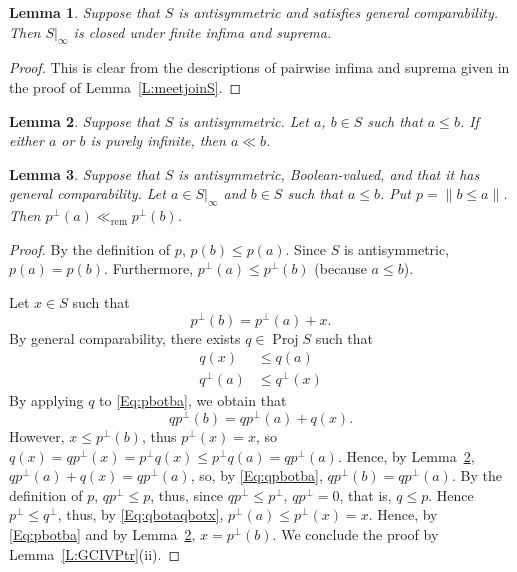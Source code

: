 \documentclass[psamsfonts,reqno]{memo-l}
\theoremstyle{plain}
\newtheorem{lemma}{Lemma}[section]
\theoremstyle{definition}
\theoremstyle{remark}
\numberwithin{equation}{section}
\newcommand{\rem}{\ll_{\mathrm{rem}}}
\newcommand{\DI}[1]{#1|_{\infty}}
\newcommand{\bv}[1]{\left\|#1\right\|}
\DeclareMathOperator{\BB}{Proj}
\begin{document}
\begin{lemma}\label{L:2-5.?}
Suppose that $S$ is antisymmetric and satisfies general comparability. Then
$\DI{S}$ is closed under finite infima and suprema.
\end{lemma}

\begin{proof}
This is clear from the descriptions of pairwise infima and suprema given in
the proof of Lemma~\ref{L:meetjoinS}.
\end{proof}

\begin{lemma}\label{L:a+b=b(pi)}
Suppose that $S$ is antisymmetric.
Let $a$, $b\in S$ such that $a\leq b$. If either $a$ or $b$ is purely
infinite, then $a\ll b$.
\end{lemma}

\begin{lemma}\label{L:BVtr}
Suppose that $S$
is antisymmetric, Boolean-valued, and that it has general
comparability. Let $a\in\DI{S}$ and $b\in S$ such that $a\leq b$. Put
$p=\bv{b\leq a}$. Then $p^\bot(a)\rem p^\bot(b)$.
\end{lemma}

\begin{proof}
By the definition of $p$, $p(b)\leq p(a)$. Since $S$ is antisymmetric,
$p(a)=p(b)$. Furthermore, $p^\bot(a)\leq p^\bot(b)$ (because $a\leq b$).

Let $x\in S$ such that
   \begin{equation}\label{Eq:pbotba}
   p^\bot(b)=p^\bot(a)+x.
   \end{equation}
By general comparability, there
exists $q\in\BB{S}$\index{pzzroj@$\BB{S}$} such that
   \begin{align}
   q(x)&\leq q(a)\label{Eq:qxqa}\\
   q^\bot(a)&\leq q^\bot(x)\label{Eq:qbotaqbotx}
   \end{align}
By applying $q$ to \eqref{Eq:pbotba}, we obtain that
   \begin{equation}\label{Eq:qpbotba}
   qp^\bot(b)=qp^\bot(a)+q(x).
   \end{equation}
However, $x\leq p^\bot(b)$, thus $p^\bot(x)=x$, so
$q(x)=qp^\bot(x)=p^\bot q(x)\leq p^\bot q(a)=qp^\bot(a)$.
Hence, by Lemma~\ref{L:a+b=b(pi)},
$qp^\bot(a)+q(x)=qp^\bot(a)$, so, by \eqref{Eq:qpbotba},
$qp^\bot(b)=qp^\bot(a)$. By the definition of $p$, $qp^\bot\leq p$, thus,
since $qp^\bot\leq p^\bot$, $qp^\bot=0$, that is, $q\leq p$. Hence
$p^\bot\leq q^\bot$, thus, by \eqref{Eq:qbotaqbotx},
$p^\bot(a)\leq p^\bot(x)=x$. Hence, by \eqref{Eq:pbotba} and by
Lemma~\ref{L:a+b=b(pi)}, $x=p^\bot(b)$. We conclude the proof by
Lemma~\ref{L:GCIVPtr}(ii).
\end{proof}
\end{document}
